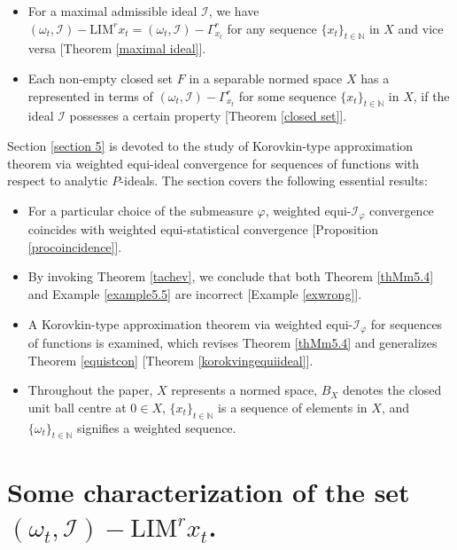 \documentclass[reqno]{amsart}
\begin{document}
{\begin{itemize}
\item For a maximal admissible ideal $\mathcal{I}$, we have $(\omega_t,\mathcal{I})-\text{LIM}^{r} x_t=(\omega_t,\mathcal{I})-\Gamma_{x_t}^r$ for any sequence $\{x_t\}_{t\in\mathbb{N}}$ in $X$ and vice versa [Theorem \ref{maximal ideal}].
\item Each non-empty closed set $F$ in a separable normed space $X$ has a represented in terms of  $(\omega_t,\mathcal{I})-\Gamma_{x_t}^r$ for some sequence $\{x_t\}_{t\in\mathbb{N}}$ in $X$, if the ideal $\mathcal{I}$  possesses a certain property [Theorem \ref{closed set}].
\end{itemize} 
Section \ref{section 5} is devoted to the study of Korovkin-type approximation theorem via weighted equi-ideal convergence for sequences of functions with respect to analytic $P$-ideals. The section covers the following essential results:
\begin{itemize}
	\item  For a particular choice of the submeasure $\varphi$, weighted equi-$\mathcal{I}_{\varphi}$ convergence coincides with weighted equi-statistical convergence [Proposition \ref{procoincidence}].
	\item  By invoking Theorem \ref{tachev}, we conclude that both Theorem \ref{thMm5.4} and Example \ref{example5.5} are incorrect
	 [Example \ref{exwrong}].
	 \item A Korovkin-type approximation theorem via weighted equi-$\mathcal{I}_{\varphi}$ for sequences of functions is examined, which revises Theorem \ref{thMm5.4} and generalizes Theorem \ref{equistcon} [Theorem \ref{korokvingequiideal}].
\end{itemize}
\vspace{0.2cm}

\begin{itemize}
\item[\textbf{Notations:}] Throughout the paper,  $X$ represents a normed space, $B_X$ denotes the closed unit ball centre at $0\in X$, $\{x_t\}_{t \in \mathbb{N}}$ is a sequence of elements in $X$, and $\{\omega_t\}_{t \in \mathbb{N}}$ signifies a weighted sequence. 
\end{itemize}





\section{Some characterization of the set $(\omega_t,\mathcal{I})-\text{LIM}^r x_t$. }\label{sec 2}




}
\end{document}
